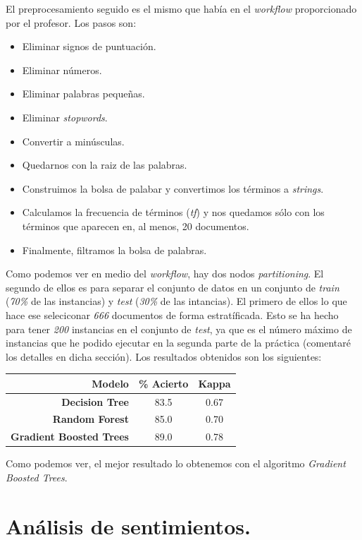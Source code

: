 \documentclass[11pt]{article}
\begin{document}
El preprocesamiento seguido es el mismo que había en el \textit{workflow} proporcionado por el profesor. Los pasos son:

\begin{itemize}
	\item Eliminar signos de puntuación.
	\item Eliminar números.
	\item Eliminar palabras pequeñas.
	\item Eliminar \textit{stopwords}.
	\item Convertir a minúsculas.
	\item Quedarnos con la raiz de las palabras.
	\item Construimos la bolsa de palabar y convertimos los términos a \textit{strings}.
	\item Calculamos la frecuencia de términos (\textit{tf}) y nos quedamos sólo con los términos que aparecen en, al menos, 20 documentos.
	\item Finalmente, filtramos la bolsa de palabras.
\end{itemize}

Como podemos ver en medio del \textit{workflow}, hay dos nodos \textit{partitioning}. El segundo de ellos es para separar el conjunto de datos en un conjunto de \textit{train} (\textit{70\%} de las instancias) y \textit{test} (\textit{30\%} de las intancias). El primero de ellos lo que hace ese seleciconar \textit{666} documentos de forma estratíficada. Esto se ha hecho para tener \textit{200} instancias en el conjunto de \textit{test}, ya que es el número máximo de instancias que he podido ejecutar en la segunda parte de la práctica (comentaré los detalles en dicha sección). Los resultados obtenidos son los siguientes: 

\begin{table}[H]
	\centering
	\begin{tabular}{rcc}
		\textbf{Modelo} & \textbf{\% Acierto} & \textbf{Kappa} \\ \hline
		\textbf{Decision Tree} & 83.5 & 0.67 \\
		\textbf{Random Forest} & 85.0 & 0.70 \\
		\textbf{Gradient Boosted Trees} & 89.0 & 0.78
	\end{tabular}
\end{table}

Como podemos ver, el mejor resultado lo obtenemos con el algoritmo \textit{Gradient Boosted Trees}.

\section{Análisis de sentimientos.}
\end{document}
